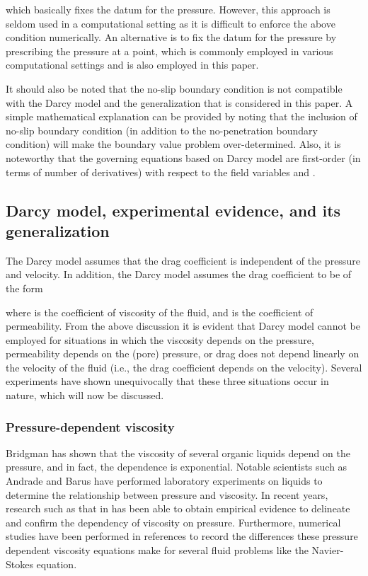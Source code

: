 \documentclass[11pt,reqno]{amsart}
\begin{document}
which basically fixes the datum for the pressure. However, 
this approach is seldom used in a computational setting as 
it is difficult to enforce the above condition numerically. 
An alternative is to fix the datum for the pressure by 
prescribing the pressure at a point, which is commonly 
employed in various computational settings and is also 
employed in this paper. 

It should also be noted that the no-slip boundary 
condition is not compatible with the Darcy model 
and the generalization that is considered in this 
paper. A simple mathematical explanation can be 
provided by noting that the inclusion of no-slip 
boundary condition (in addition to the no-penetration 
boundary condition) will make the boundary value 
problem over-determined. Also, it is noteworthy 
that the governing equations based on Darcy model 
are first-order (in terms of number of derivatives) 
with respect to the field variables  and . 

\subsection{Darcy model, experimental evidence, and its generalization}
The Darcy model assumes that the drag coefficient is 
independent of the pressure and velocity. In addition, 
the Darcy model assumes the drag coefficient to be of 
the form

where  is the coefficient of viscosity of the fluid, 
and  is the coefficient of permeability. From the above 
discussion it is evident that Darcy model cannot be employed 
for situations in which the viscosity depends on the pressure, 
permeability depends on the (pore) pressure, or drag does not 
depend linearly on the velocity of the fluid (i.e., the drag 
coefficient depends on the velocity). Several experiments 
have shown unequivocally that these three situations occur 
in nature, which will now be discussed. 

\subsubsection{Pressure-dependent viscosity}
Bridgman \cite{Bridgman} has shown that the 
viscosity of several organic liquids depend on the 
pressure, and in fact, the dependence is exponential. 
Notable scientists such as Andrade \cite{Andrade} 
and Barus \cite{CarlBarus} have performed laboratory 
experiments on liquids to determine the relationship 
between pressure and viscosity. In recent years, 
research such as that in \cite{vanLeeuwen} has 
been able to obtain empirical evidence to delineate 
and confirm the dependency of viscosity on pressure. 
Furthermore, numerical studies have been performed 
in references \cite{M_Franta_Rajagopal,A_Him_FE_approximate} 
to record the differences these pressure dependent viscosity 
equations make for several fluid problems like the 
Navier-Stokes equation.
\end{document}
